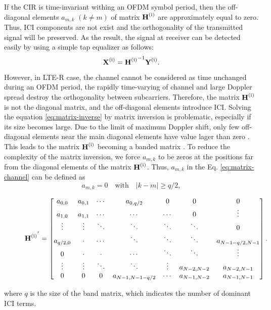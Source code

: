 \documentclass[AMA]{WileyNJD-v1}
\begin{document}
If the CIR is time-invariant withing an OFDM symbol period, then the off-diagonal elements $a_{m,k}$ $(k\neq m)$ of matrix $\rm{\textbf H^{(i)}}$ are approximately equal to zero. Thus, ICI components are not exist and the orthogonality of the transmitted signal will be preserved. As the result, the signal at receiver can be detected easily by using a simple tap equalizer as follows:
%
\begin{equation}\label{eq:matrix-inverse}
\rm {\textbf X^{(i)}}= \rm {\textbf H^{(i)}}^{-1}{\rm {\textbf Y^{(i)}}}.
\end{equation}
%
	
However, in LTE-R case, the channel cannot be considered as time  unchanged during an OFDM period, the rapidly time-varying of channel and large Doppler spread destroy the orthogonality between subcarriers. Therefore, the matrix $\rm{\textbf H^{(i)}}$ is not the diagonal matrix, and the off-diagonal elements introduce ICI. Solving  the equation \eqref{eq:matrix-inverse} by matrix inversion is problematic, especially if its size becomes large. Due to the limit of maximum Doppler shift, only few off-diagonal elements near the main diagonal elements have value lager than zero \cite{Jeon1999}. This leads to the matrix $\rm{\textbf H^{(i)}}$ becoming a banded matrix \cite{Cai2003}. To reduce the complexity of the matrix inversion, we force $a_{m,k}$ to be zeros at the positions far from the diagonal elements of the matrix $\rm{\textbf H^{(i)}}$. Thus,  $a_{m,k}$ in the Eq. \eqref{eq:matrix-channel} can be defined as
%
\begin{equation}
a_{m,k}=0\quad  \text{with}\quad  |k-m|\geqslant q/2,
\end{equation}
%
\begin{figure*}[t]
\begin{equation}\label{eq:banded matrix}
\begin{aligned}
		\rm {\textbf H^{(i)}}^{'} = \begin{bmatrix} 
		a_{0,0} & a_{0,1}& \cdots & a_{0,q/2} & 0 & 0 &0
		\\ a_{1,0} & a_{1,1} & \cdots & \cdots &\cdots& 0 & \vdots
		\\ \vdots & \vdots & \ddots & \ddots &\ddots & \ddots &0
		\\ a_{q/2,0} & \cdot & \cdots & \ddots & \ddots & \ddots & a_{N - 1 - q/2,N - 1}
		\\0&\cdot& \cdot& \cdots &\ddots& \ddots &\vdots
		\\ \vdots & \vdots & \ddots & \ddots & \vdots & a_{N - 2,N - 2}  & a_{N - 2,N - 1}
		\\0 &0&0 & a_{N - 1,N -1- q/2}& \cdots & a_{N - 1,N - 2}&a_{N - 1,N - 1}\end{bmatrix}.
	\end{aligned}
	\end{equation}
\end{figure*}
where $q$ is the size of the band matrix, which indicates the number of dominant ICI terms. 
	
\end{document}
